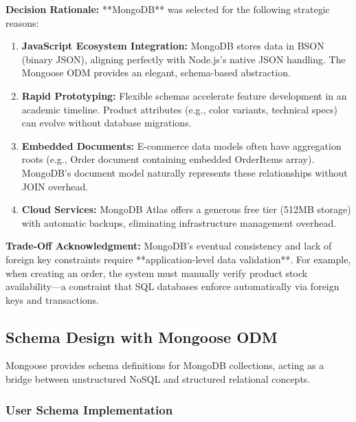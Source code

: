 \textbf{Decision Rationale:} **MongoDB** was selected for the following strategic reasons:

\begin{enumerate}
    \item \textbf{JavaScript Ecosystem Integration:} MongoDB stores data in BSON (binary JSON), aligning perfectly with Node.js's native JSON handling. The Mongoose ODM provides an elegant, schema-based abstraction.
    
    \item \textbf{Rapid Prototyping:} Flexible schemas accelerate feature development in an academic timeline. Product attributes (e.g., color variants, technical specs) can evolve without database migrations.
    
    \item \textbf{Embedded Documents:} E-commerce data models often have aggregation roots (e.g., Order document containing embedded OrderItems array). MongoDB's document model naturally represents these relationships without JOIN overhead.
    
    \item \textbf{Cloud Services:} MongoDB Atlas offers a generous free tier (512MB storage) with automatic backups, eliminating infrastructure management overhead.
\end{enumerate}

\textbf{Trade-Off Acknowledgment:} MongoDB's eventual consistency and lack of foreign key constraints require **application-level data validation**. For example, when creating an order, the system must manually verify product stock availability—a constraint that SQL databases enforce automatically via foreign keys and transactions.

\subsection{Schema Design with Mongoose ODM}

Mongoose provides schema definitions for MongoDB collections, acting as a bridge between unstructured NoSQL and structured relational concepts.

\subsubsection{User Schema Implementation}

